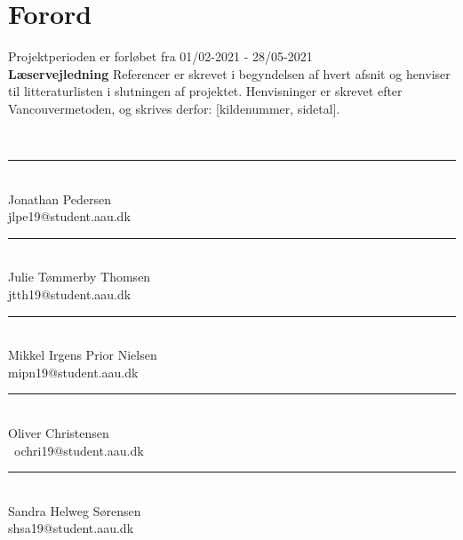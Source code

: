 \section*{Forord}


Projektperioden er forløbet fra 01/02-2021 - 28/05-2021\\

\large\textbf{Læservejledning} \normalsize \newline
Referencer er skrevet i begyndelsen af hvert afsnit og henviser til litteraturlisten i slutningen af projektet. Henvisninger er skrevet efter Vancouvermetoden, og skrives derfor: [kildenummer, sidetal].     %

\bigskip

\textcolor{white}{tekst}

\begin{minipage}[L]{0.45\textwidth}
 \centering
 \rule{\textwidth}{0.5pt}\\
  Jonathan Pedersen\\
 {\footnotesize jlpe19@student.aau.dk}
\end{minipage}
\hfill
\begin{minipage}[H]{0.45\textwidth}
 \centering
 \rule{\textwidth}{0.5pt}\\
  Julie Tømmerby Thomsen\\
 {\footnotesize jtth19@student.aau.dk}
\end{minipage}
\vspace{3\baselineskip}


\begin{minipage}[L]{0.45\textwidth}
 \centering
 \rule{\textwidth}{0.5pt}\\
 Mikkel Irgens Prior Nielsen\\
 {\footnotesize mipn19@student.aau.dk}
\end{minipage}
\hfill
\begin{minipage}[H]{0.45\textwidth}
 \centering
 \rule{\textwidth}{0.5pt}\\
  Oliver Christensen\\\
 {\footnotesize ochri19@student.aau.dk}
\end{minipage}
\vspace{3\baselineskip}


\begin{minipage}[H]{0.45\textwidth}
 \centering
 \rule{\textwidth}{0.5pt}\\
 Sandra Helweg Sørensen\\
 {\footnotesize shsa19@student.aau.dk}
\end{minipage}


